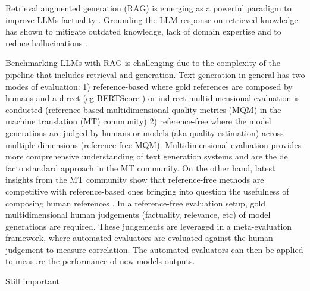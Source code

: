 
Retrieval augmented generation (RAG) is emerging as a powerful paradigm to improve LLMs factuality \cite{gao_retrieval-augmented_2024}. 
Grounding the LLM response on retrieved knowledge has shown to mitigate outdated knowledge, lack of domain expertise and to reduce hallucinations \cite{lewis2020retrieval, gao_retrieval-augmented_2024}. 

Benchmarking LLMs with RAG is challenging due to the complexity of the pipeline that includes retrieval and generation. Text generation in general has two modes of evaluation: 1) reference-based where gold references are composed by humans and a direct (eg BERTScore \cite{Zhang2020BERTScore:}) or indirect multidimensional evaluation is conducted (reference-based multidimensional quality metrics (MQM) \cite{burchardt-2013-mqm} in the machine translation (MT) community) 2) reference-free where the model generations are judged by humans or models (aka quality estimation) across multiple dimensions (reference-free MQM). Multidimensional evaluation provides more comprehensive understanding of text generation systems and are the de facto %
standard approach in the MT community. On the other hand, latest insights from the MT community show that reference-free methods are competitive with reference-based ones bringing into question the usefulness of composing human references \cite{rei-etal-2021-references, freitag-etal-2024-wmt24refnoref}. %
In a reference-free evaluation setup, gold multidimensional human judgements (factuality, relevance, etc) of model generations are required. These judgements are leveraged in a meta-evaluation framework, where automated evaluators are evaluated against the human judgement to measure correlation. The automated evaluators can then be applied to measure the performance of new models outputs. 

Still important \cite{wu_how_2024}


